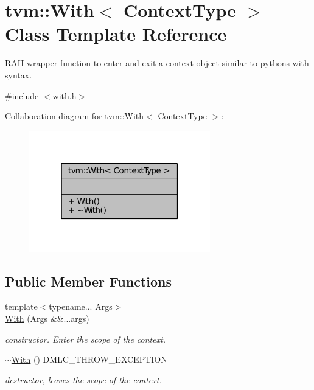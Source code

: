 \hypertarget{classtvm_1_1With}{}\section{tvm\+:\+:With$<$ Context\+Type $>$ Class Template Reference}
\label{classtvm_1_1With}


R\+A\+II wrapper function to enter and exit a context object similar to python\textquotesingle{}s with syntax.  




{\ttfamily \#include $<$with.\+h$>$}



Collaboration diagram for tvm\+:\+:With$<$ Context\+Type $>$\+:
\nopagebreak
\begin{figure}[H]
\begin{center}
\leavevmode
\includegraphics[width=223pt]{classtvm_1_1With__coll__graph}
\end{center}
\end{figure}
\subsection*{Public Member Functions}
\begin{DoxyCompactItemize}
\item 
{\footnotesize template$<$typename... Args$>$ }\\\hyperlink{classtvm_1_1With_a6546ddcfe91125f25b794e6145b870ed}{With} (Args \&\&...args)
\begin{DoxyCompactList}\small\item\em constructor. Enter the scope of the context. \end{DoxyCompactList}\item 
\hyperlink{classtvm_1_1With_adc3aab8dafb5d3afebc82733e3893a4f}{$\sim$\+With} () D\+M\+L\+C\+\_\+\+T\+H\+R\+O\+W\+\_\+\+E\+X\+C\+E\+P\+T\+I\+ON
\begin{DoxyCompactList}\small\item\em destructor, leaves the scope of the context. \end{DoxyCompactList}\end{DoxyCompactItemize}


